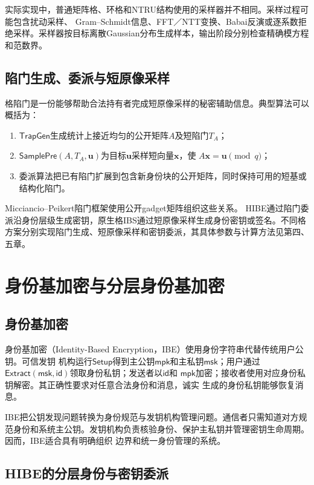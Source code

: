 实际实现中，普通矩阵格、环格和NTRU结构使用的采样器并不相同。采样过程可能包含扰动采样、
Gram--Schmidt信息、FFT／NTT变换、Babai反演或逐系数拒绝采样。采样器按目标离散Gaussian分布生成样本，输出阶段分别检查精确模方程和范数界。

\subsection{陷门生成、委派与短原像采样}

格陷门是一份能够帮助合法持有者完成短原像采样的秘密辅助信息。典型算法可以概括为：

\begin{enumerate}
  \item $\mathsf{TrapGen}$生成统计上接近均匀的公开矩阵$A$及短陷门$T_A$；
  \item $\mathsf{SamplePre}(A,T_A,\mathbf u)$为目标$\mathbf u$采样短向量$\mathbf x$，使
        $A\mathbf x=\mathbf u\pmod q$；
  \item 委派算法把已有陷门扩展到包含新身份块的公开矩阵，同时保持可用的短基或结构化陷门。
\end{enumerate}

Micciancio--Peikert陷门框架使用公开gadget矩阵组织这些关系\cite{micciancio2012trapdoors}。
HIBE通过陷门委派沿身份层级生成密钥，原生格IBS通过短原像采样生成身份密钥或签名。不同格方案分别实现陷门生成、短原像采样和密钥委派，其具体参数与计算方法见第四、五章。

\section{身份基加密与分层身份基加密}

\subsection{身份基加密}

身份基加密（Identity-Based Encryption，IBE）使用身份字符串代替传统用户公钥。可信发钥
机构运行$\mathsf{Setup}$得到主公钥$\mathsf{mpk}$和主私钥$\mathsf{msk}$；用户通过
$\mathsf{Extract}(\mathsf{msk},\mathsf{id})$领取身份私钥；发送者以$\mathsf{id}$和
$\mathsf{mpk}$加密；接收者使用对应身份私钥解密。其正确性要求对任意合法身份和消息，诚实
生成的身份私钥能够恢复消息。

IBE把公钥发现问题转换为身份规范与发钥机构管理问题。通信者只需知道对方规范身份和系统主公钥。发钥机构负责核验身份、保护主私钥并管理密钥生命周期。因而，IBE适合具有明确组织
边界和统一身份管理的系统。

\subsection{HIBE的分层身份与密钥委派}

